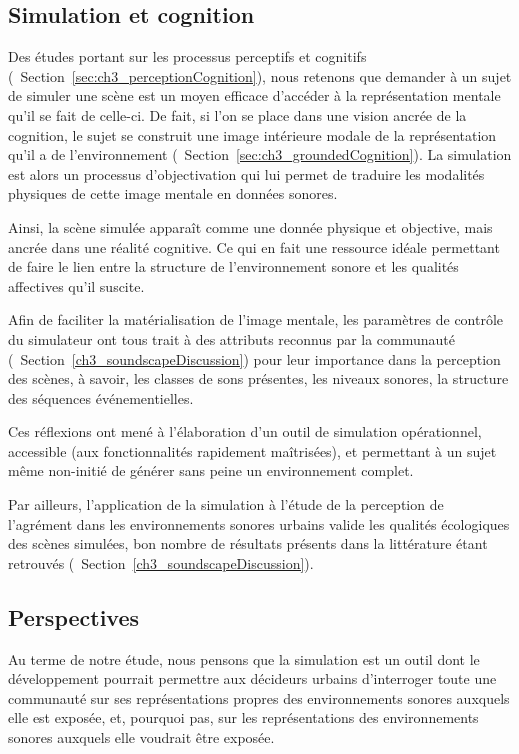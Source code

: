 \subsection{Simulation et cognition}

Des études portant sur les processus perceptifs et cognitifs (\cf~Section~\ref{sec:ch3_perceptionCognition}), nous retenons que demander à un sujet de simuler une scène est un moyen efficace d'accéder à la représentation mentale qu'il se fait de celle-ci. De fait, si l'on se place dans une vision ancrée de la cognition, le sujet se construit une image intérieure modale de la représentation qu'il a de l'environnement (\cf~Section~\ref{sec:ch3_groundedCognition}). La simulation est alors un processus d'objectivation qui lui permet de traduire les modalités physiques de cette image mentale en données sonores.

Ainsi, la scène simulée apparaît comme une donnée physique et objective, mais ancrée dans une réalité cognitive. Ce qui en fait une ressource idéale permettant de faire le lien entre la structure de l'environnement sonore et les qualités affectives qu'il suscite.

Afin de faciliter la matérialisation de l'image mentale, les paramètres de contrôle du simulateur ont tous trait à des attributs reconnus par la communauté (\cf~Section~\ref{ch3_soundscapeDiscussion}) pour leur importance dans la perception des scènes, à savoir, les classes de sons présentes, les niveaux sonores, la structure des séquences événementielles.

Ces réflexions ont mené à l'élaboration d'un outil de simulation opérationnel, accessible (aux fonctionnalités rapidement maîtrisées), et permettant à un sujet même non-initié de générer sans peine un environnement complet.

Par ailleurs, l'application de la simulation à l’étude de la perception de l'agrément dans les environnements sonores urbains valide les qualités écologiques des scènes simulées, bon nombre de résultats présents dans la littérature étant retrouvés (\cf~Section~\ref{ch3_soundscapeDiscussion}).

\subsection{Perspectives}

Au terme de notre étude, nous pensons que la simulation est un outil dont le développement pourrait permettre aux décideurs urbains d'interroger toute une communauté sur ses représentations propres des environnements sonores auxquels elle est exposée, et, pourquoi pas, sur les représentations des environnements sonores auxquels elle voudrait être exposée.

